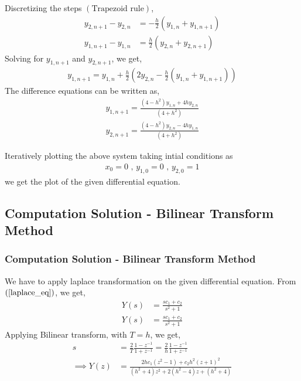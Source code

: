 \documentclass{beamer}
\providecommand{\brak}[1]{\ensuremath{\left(#1\right)}}
\theoremstyle{remark}
\numberwithin{equation}{section}
\begin{document}
\begin{frame}
Discretizing the steps \brak{\text{Trapezoid rule}},
\begin{align}
    y_{2, n + 1} - y_{2, n} &= -\frac{h}{2}\brak{y_{1, n} + y_{1, n + 1}}\\
    y_{1, n + 1} - y_{1, n} &= \frac{h}{2}\brak{y_{2, n} + y_{2, n + 1}}
\end{align}
Solving for $y_{1, n + 1}$ and $y_{2, n + 1}$, we get,
\begin{align}
    y_{1, n + 1} = y_{1, n} + \frac{h}{2}\brak{2y_{2, n} - \frac{h}{2}\brak{y_{1, n} + y_{1, n + 1}}}
\end{align}
The difference equations can be written as,
\begin{align}
    y_{1, n + 1} = \frac{\brak{4 - h^2}y_{1, n} + 4hy_{2, n}}{\brak{4 + h^2}}\\
    y_{2, n + 1} = \frac{\brak{4 - h^2}y_{2, n} - 4hy_{1, n}}{\brak{4 + h^2}}
\end{align}
\end{frame}

\begin{frame}
Iteratively plotting the above system taking intial conditions as 
\begin{align}
    x_0 = 0 \text{ , } y_{1, 0} = 0 \text{ , } y_{2, 0} = 1
\end{align}
we get the plot of the given differential equation.
\end{frame}

\subsection{Computation Solution - Bilinear Transform Method}
\begin{frame}
\frametitle{Computation Solution - Bilinear Transform Method}
We have to apply laplace transformation on the given differential equation. From \brak{\ref{laplace_eq}}, we get,
\begin{align}
    Y\brak{s} &= \frac{sc_1 + c_2}{s^2 + 1}
\end{align}
\begin{align}
    Y\brak{s} &= \frac{sc_1 + c_2}{s^2 + 1}
\end{align}
Applying Bilinear transform, with $T = h$, we get,
\begin{align}
    s &= \frac{2}{T}\frac{1 - z^{-1}}{1 + z^{-1}} = \frac{2}{h}\frac{1 - z^{-1}}{1 + z^{-1}}\\
    \implies Y\brak{z} &= \frac{2hc_1 \brak{z^2 - 1} + c_2h^2 \brak{z + 1}^2}{\brak{h^2 + 4}z^2 + 2\brak{h^2 - 4}z + \brak{h^2 + 4}}
\end{align}
\end{frame}
\end{document}
